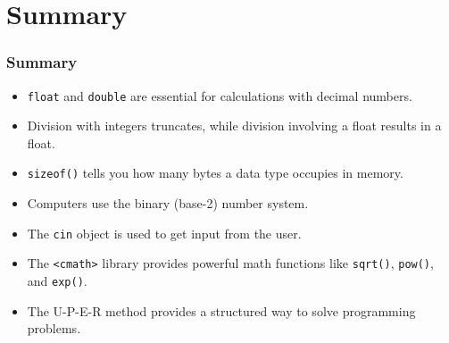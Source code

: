 \documentclass{beamer}
\begin{document}
\section{Summary}

\begin{frame}
\frametitle{Summary}
\begin{itemize}
    \item \texttt{float} and \texttt{double} are essential for calculations with decimal numbers.
    \item Division with integers \alert{truncates}, while division involving a float results in a float.
    \item \texttt{sizeof()} tells you how many \alert{bytes} a data type occupies in memory.
    \item Computers use the \alert{binary} (base-2) number system.
    \item The \texttt{cin} object is used to get input from the user.
    \item The \texttt{<cmath>} library provides powerful math functions like \texttt{sqrt()}, \texttt{pow()}, and \texttt{exp()}.
    \item The \alert{U-P-E-R method} provides a structured way to solve programming problems.
\end{itemize}
\end{frame}
\end{document}
